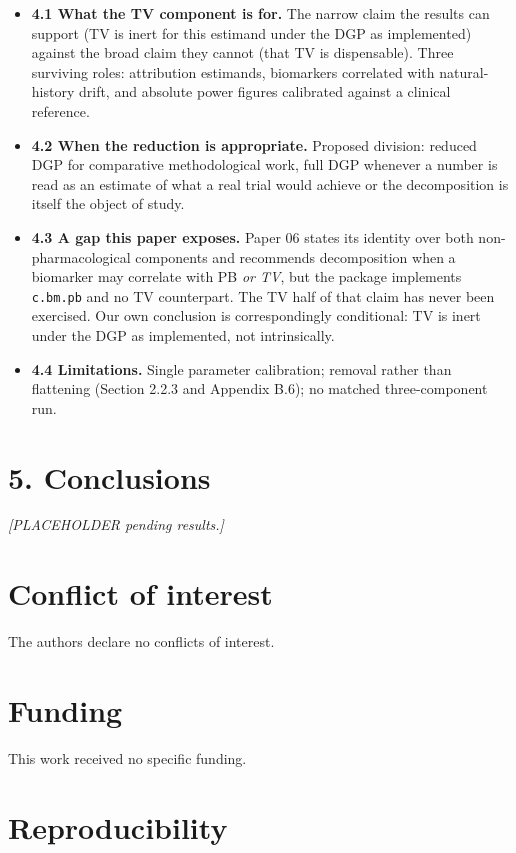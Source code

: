 \documentclass[
  11pt,
]{article}
\begin{document}
\begin{itemize}
\item \textbf{4.1 What the TV component is for.} The narrow claim
  the results can support (TV is inert for this estimand under the
  DGP as implemented) against the broad claim they cannot (that TV
  is dispensable). Three surviving roles: attribution estimands,
  biomarkers correlated with natural-history drift, and absolute
  power figures calibrated against a clinical reference.
\item \textbf{4.2 When the reduction is appropriate.} Proposed
  division: reduced DGP for comparative methodological work, full
  DGP whenever a number is read as an estimate of what a real trial
  would achieve or the decomposition is itself the object of study.
\item \textbf{4.3 A gap this paper exposes.} Paper 06 states its
  identity over both non-pharmacological components and recommends
  decomposition when a biomarker may correlate with PB \emph{or TV},
  but the package implements \texttt{c.bm.pb} and no TV counterpart.
  The TV half of that claim has never been exercised. Our own
  conclusion is correspondingly conditional: TV is inert under the
  DGP as implemented, not intrinsically.
\item \textbf{4.4 Limitations.} Single parameter calibration; removal
  rather than flattening (Section 2.2.3 and Appendix B.6); no matched
  three-component run.
\end{itemize}

\section{5. Conclusions}

\emph{[PLACEHOLDER pending results.]}

\section{Conflict of interest}

The authors declare no conflicts of interest.

\section{Funding}

This work received no specific funding.

\section{Reproducibility}
\end{document}
